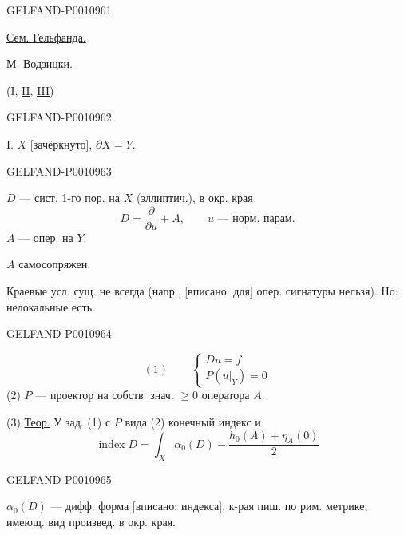 \begin{GelfandAdjacentEvidence}{GELFAND-P001096}{1}
\begin{center}
\qquad\underline{Сем. Гельфанда.}
\end{center}

\underline{М. Водзицки.}

 (I, \underline{II}, \underline{III})
\end{GelfandAdjacentEvidence}
\begin{GelfandAdjacentEvidence}{GELFAND-P001096}{2}


I. $X$ [зачёркнуто], $\partial X=Y$.
\end{GelfandAdjacentEvidence}
\begin{GelfandAdjacentEvidence}{GELFAND-P001096}{3}


$D$ — сист. 1-го пор. на $X$ (эллиптич.), в окр. края
\[
D=\frac{\partial}{\partial u}+A,\qquad
u\text{ — норм. парам.}
\]
$A$ — опер. на $Y$.

$A$ самосопряжен.

Краевые усл. сущ. не всегда (напр., [вписано: для] опер. сигнатуры нельзя). Но: нелокальные есть.
\end{GelfandAdjacentEvidence}
\begin{GelfandAdjacentEvidence}{GELFAND-P001096}{4}


\[
(1)\qquad
\begin{cases}
Du=f\\
P(u|_Y)=0
\end{cases}
\]
(2) $P$ — проектор на собств. знач. $\ge 0$ оператора $A$.

(3) \underline{Теор.} У зад. (1) с $P$ вида (2) конечный индекс и
\[
\operatorname{index}D=\int_X\alpha_0(D)-\frac{h_0(A)+\eta_A(0)}{2}
\]
\end{GelfandAdjacentEvidence}
\begin{GelfandAdjacentEvidence}{GELFAND-P001096}{5}


$\alpha_0(D)$ — дифф. форма [вписано: индекса], к-рая пиш. по рим. метрике, имеющ. вид произвед. в окр. края.
\end{GelfandAdjacentEvidence}
